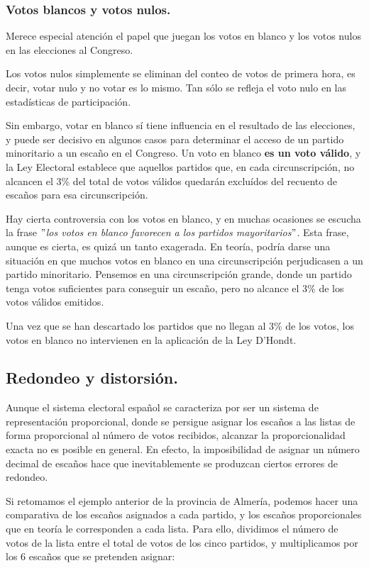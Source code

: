 \documentclass[11pt]{article}
\begin{document}
	
	\subsubsection{Votos blancos y votos nulos.}
	
	Merece especial atención el papel que juegan los votos en blanco y los votos nulos en las elecciones al Congreso.
	
	Los votos nulos simplemente se eliminan del conteo de votos de primera hora, es decir, votar nulo y no votar es lo mismo. Tan sólo se refleja el voto nulo en las estadísticas de participación.
	
	Sin embargo, votar en blanco sí tiene influencia en el resultado de las elecciones, y puede ser decisivo en algunos casos para determinar el acceso de un partido minoritario a un escaño en el Congreso. Un voto en blanco \textbf{es un voto válido}, y la Ley Electoral establece que aquellos partidos que, en cada circunscripción, no alcancen el 3\% del total de votos válidos quedarán excluídos del recuento de escaños para esa circunscripción.
	
	Hay cierta controversia con los votos en blanco, y en muchas ocasiones se escucha la frase $"$\textit{los votos en blanco favorecen a los partidos mayoritarios}$"$. Esta frase, aunque es cierta, es quizá un tanto exagerada. En teoría, podría darse una situación en que muchos votos en blanco en una circunscripción perjudicasen a un partido minoritario. Pensemos en una circunscripción grande, donde un partido tenga votos suficientes para conseguir un escaño, pero no alcance el 3\% de los votos válidos emitidos.
	
	Una vez que se han descartado los partidos que no llegan al 3\% de los votos, los votos en blanco no intervienen en la aplicación de la Ley D'Hondt.
	
	\subsection{Redondeo y distorsión.}
	
	Aunque el sistema electoral español se caracteriza por ser un sistema de representación proporcional, donde se persigue asignar los escaños a las listas de forma proporcional al número de votos recibidos, alcanzar la proporcionalidad exacta no es posible en general. En efecto, la imposibilidad de asignar un número decimal de escaños hace que inevitablemente se produzcan ciertos errores de redondeo.
	
	 Si retomamos el ejemplo anterior de la provincia de Almería, podemos hacer una comparativa de los escaños asignados a cada partido, y los escaños proporcionales que en teoría le corresponden a cada lista. Para ello, dividimos el número de votos de la lista entre el total de votos de los cinco partidos, y multiplicamos por los 6 escaños que se pretenden asignar: 
	 
\end{document}
